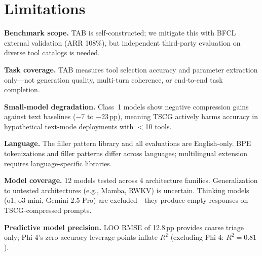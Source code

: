 \section{Limitations}
\label{sec:limitations}


\textbf{Benchmark scope.} TAB is self-constructed; we mitigate this with BFCL external validation (ARR 108\%), but independent third-party evaluation on diverse tool catalogs is needed.

\textbf{Task coverage.} TAB measures tool selection accuracy and parameter extraction only---not generation quality, multi-turn coherence, or end-to-end task completion.

\textbf{Small-model degradation.} Class~1 models show negative compression gains against text baselines ($-$7 to $-$23\,pp), meaning TSCG actively harms accuracy in hypothetical text-mode deployments with $<$10 tools.

\textbf{Language.} The filler pattern library and all evaluations are English-only. BPE tokenizations and filler patterns differ across languages; multilingual extension requires language-specific libraries.

\textbf{Model coverage.} 12 models tested across 4 architecture families. Generalization to untested architectures (e.g., Mamba, RWKV) is uncertain. Thinking models (o1, o3-mini, Gemini 2.5 Pro) are excluded---they produce empty responses on TSCG-compressed prompts.

\textbf{Predictive model precision.} LOO RMSE of 12.8\,pp provides coarse triage only; Phi-4's zero-accuracy leverage points inflate $R^2$ (excluding Phi-4: $R^2{=}0.81$).
